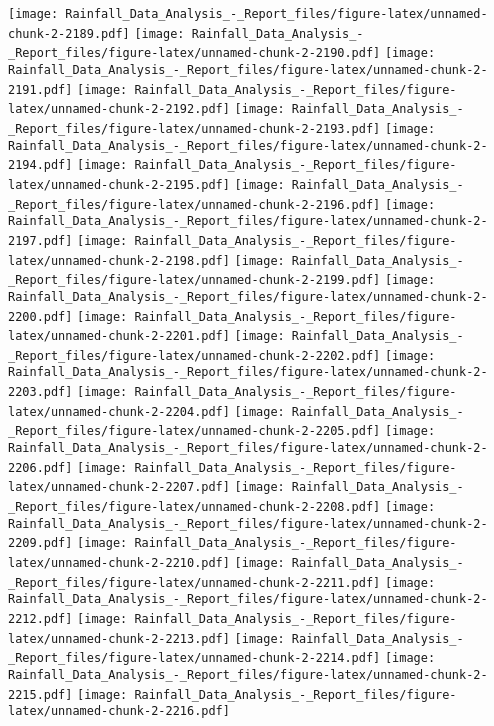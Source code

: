 \documentclass[
]{article}
\begin{document}
\texttt{[image: Rainfall\_Data\_Analysis\_-\_Report\_files/figure-latex/unnamed-chunk-2-2189.pdf]}
\texttt{[image: Rainfall\_Data\_Analysis\_-\_Report\_files/figure-latex/unnamed-chunk-2-2190.pdf]}
\texttt{[image: Rainfall\_Data\_Analysis\_-\_Report\_files/figure-latex/unnamed-chunk-2-2191.pdf]}
\texttt{[image: Rainfall\_Data\_Analysis\_-\_Report\_files/figure-latex/unnamed-chunk-2-2192.pdf]}
\texttt{[image: Rainfall\_Data\_Analysis\_-\_Report\_files/figure-latex/unnamed-chunk-2-2193.pdf]}
\texttt{[image: Rainfall\_Data\_Analysis\_-\_Report\_files/figure-latex/unnamed-chunk-2-2194.pdf]}
\texttt{[image: Rainfall\_Data\_Analysis\_-\_Report\_files/figure-latex/unnamed-chunk-2-2195.pdf]}
\texttt{[image: Rainfall\_Data\_Analysis\_-\_Report\_files/figure-latex/unnamed-chunk-2-2196.pdf]}
\texttt{[image: Rainfall\_Data\_Analysis\_-\_Report\_files/figure-latex/unnamed-chunk-2-2197.pdf]}
\texttt{[image: Rainfall\_Data\_Analysis\_-\_Report\_files/figure-latex/unnamed-chunk-2-2198.pdf]}
\texttt{[image: Rainfall\_Data\_Analysis\_-\_Report\_files/figure-latex/unnamed-chunk-2-2199.pdf]}
\texttt{[image: Rainfall\_Data\_Analysis\_-\_Report\_files/figure-latex/unnamed-chunk-2-2200.pdf]}
\texttt{[image: Rainfall\_Data\_Analysis\_-\_Report\_files/figure-latex/unnamed-chunk-2-2201.pdf]}
\texttt{[image: Rainfall\_Data\_Analysis\_-\_Report\_files/figure-latex/unnamed-chunk-2-2202.pdf]}
\texttt{[image: Rainfall\_Data\_Analysis\_-\_Report\_files/figure-latex/unnamed-chunk-2-2203.pdf]}
\texttt{[image: Rainfall\_Data\_Analysis\_-\_Report\_files/figure-latex/unnamed-chunk-2-2204.pdf]}
\texttt{[image: Rainfall\_Data\_Analysis\_-\_Report\_files/figure-latex/unnamed-chunk-2-2205.pdf]}
\texttt{[image: Rainfall\_Data\_Analysis\_-\_Report\_files/figure-latex/unnamed-chunk-2-2206.pdf]}
\texttt{[image: Rainfall\_Data\_Analysis\_-\_Report\_files/figure-latex/unnamed-chunk-2-2207.pdf]}
\texttt{[image: Rainfall\_Data\_Analysis\_-\_Report\_files/figure-latex/unnamed-chunk-2-2208.pdf]}
\texttt{[image: Rainfall\_Data\_Analysis\_-\_Report\_files/figure-latex/unnamed-chunk-2-2209.pdf]}
\texttt{[image: Rainfall\_Data\_Analysis\_-\_Report\_files/figure-latex/unnamed-chunk-2-2210.pdf]}
\texttt{[image: Rainfall\_Data\_Analysis\_-\_Report\_files/figure-latex/unnamed-chunk-2-2211.pdf]}
\texttt{[image: Rainfall\_Data\_Analysis\_-\_Report\_files/figure-latex/unnamed-chunk-2-2212.pdf]}
\texttt{[image: Rainfall\_Data\_Analysis\_-\_Report\_files/figure-latex/unnamed-chunk-2-2213.pdf]}
\texttt{[image: Rainfall\_Data\_Analysis\_-\_Report\_files/figure-latex/unnamed-chunk-2-2214.pdf]}
\texttt{[image: Rainfall\_Data\_Analysis\_-\_Report\_files/figure-latex/unnamed-chunk-2-2215.pdf]}
\texttt{[image: Rainfall\_Data\_Analysis\_-\_Report\_files/figure-latex/unnamed-chunk-2-2216.pdf]}
\end{document}
